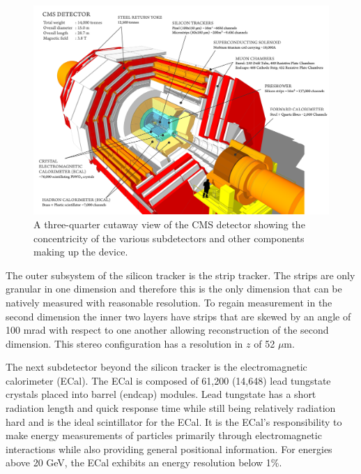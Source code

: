 \documentclass[a4paper,12pt]{article}
\begin{document}
    \begin{figure}[ht]
        \begin{center}
            \includegraphics[width=0.9\linewidth]{Figures/CMS_Detector_Cutaway.png}
        \end{center}
        \caption{A three-quarter cutaway view of the CMS detector showing the
        concentricity of the various subdetectors and other
        components making up the device.\cite{CMSCutaway}}
        \label{fig:cms}
    \end{figure}
    
    The outer subsystem of the silicon tracker is the strip tracker. The strips
    are only granular in one dimension and therefore this is the only dimension
    that can be natively measured with reasonable resolution. To regain
    measurement in the second dimension the inner two layers have strips that
    are skewed by an angle of 100 mrad with respect to one another allowing
    reconstruction of the second dimension. This stereo configuration has a
    resolution in $z$ of 52 $\mu$m. 
    
    The next subdetector beyond the silicon tracker is the electromagnetic
    calorimeter (ECal). The ECal is composed of 61,200 (14,648) lead tungstate
    crystals placed into barrel (endcap) modules. Lead tungstate has a short
    radiation length and quick response time while still being relatively
    radiation hard and is the ideal scintillator for the ECal. It is the ECal's
    responsibility to make energy measurements of particles primarily through
    electromagnetic interactions while also providing general positional
    information. For energies above 20 GeV, the ECal exhibits an energy
    resolution below 1\%.
\end{document}
